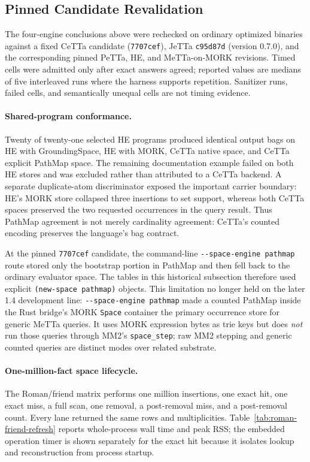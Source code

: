\documentclass[11pt]{article}
\newcommand{\code}[1]{\texttt{#1}}
\newcommand{\PeTTa}{\textup{PeTTa}}
\newcommand{\CeTTa}{\textup{CeTTa}}
\newcommand{\PathMap}{\textup{PathMap}}
\begin{document}
\subsection{Pinned Candidate Revalidation}
\label{sec:pinned-candidate-revalidation}

The four-engine conclusions above were rechecked on ordinary optimized
binaries against a fixed \CeTTa{} candidate
(\code{7707cef}), JeTTa \code{c95d87d} (version 0.7.0), and the
corresponding pinned \PeTTa{}, HE, and MeTTa-on-MORK revisions.  Timed
cells were admitted only after exact answers agreed; reported values are
medians of five interleaved runs where the harness supports repetition.
Sanitizer runs, failed cells, and semantically unequal cells are not
timing evidence.

\paragraph{Shared-program conformance.}
Twenty of twenty-one selected HE programs produced identical output
bags on HE with GroundingSpace, HE with MORK, \CeTTa{} native space, and
\CeTTa{} explicit \PathMap{} space.  The remaining documentation example
failed on both HE stores and was excluded rather than attributed to a
\CeTTa{} backend.  A separate duplicate-atom discriminator exposed the
important carrier boundary: HE's MORK store collapsed three insertions
to set support, whereas both \CeTTa{} spaces preserved the two requested
occurrences in the query result.  Thus \PathMap{} agreement is not merely
cardinality agreement: \CeTTa{}'s counted encoding preserves the language's
bag contract.

At the pinned \code{7707cef} candidate, the command-line
\code{-{}-space-engine pathmap} route stored only the bootstrap portion in
\PathMap{} and then fell back to the ordinary evaluator space.  The tables
in this historical subsection therefore used explicit
\code{(new-space pathmap)} objects.  This limitation no longer held on
the later 1.4 development line: \code{-{}-space-engine pathmap} made a
counted \PathMap{} inside the Rust bridge's MORK \code{Space} container the
primary occurrence store for generic MeTTa queries.  It uses MORK expression
bytes as trie keys but does \emph{not} run those queries through MM2's
\code{space\_step}; raw MM2 stepping and generic counted queries are distinct
modes over related substrate.

\paragraph{One-million-fact space lifecycle.}
The Roman/friend matrix performs one million insertions, one exact hit,
one exact miss, a full scan, one removal, a post-removal miss, and a
post-removal count.  Every lane returned the same rows and multiplicities.
Table~\ref{tab:roman-friend-refresh} reports whole-process wall time and
peak RSS; the embedded operation timer is shown separately for the exact
hit because it isolates lookup and reconstruction from process startup.
\end{document}
